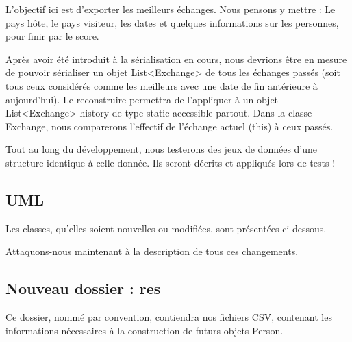 \documentclass{mytex}
\begin{document}

L'objectif ici est d'exporter les meilleurs échanges.
Nous pensons y mettre : Le pays hôte, le pays visiteur, les dates et quelques informations sur les personnes, pour finir par le score.


Après avoir été introduit à la sérialisation en cours, nous devrions être en mesure de pouvoir sérialiser un objet List<Exchange> de tous les échanges passés (soit tous ceux considérés comme les meilleurs avec une date de fin antérieure à aujourd'hui). Le reconstruire permettra de l'appliquer à un objet List<Exchange> history de type static accessible partout. Dans la classe Exchange, nous comparerons l'effectif de l'échange actuel (this) à ceux passés.


Tout au long du développement, nous testerons des jeux de données d'une structure identique à celle donnée. Ils seront décrits et appliqués lors de tests !

\subsection{UML}

Les classes, qu'elles soient nouvelles ou modifiées, sont présentées ci-dessous.


Attaquons-nous maintenant à la description de tous ces changements.



\subsection{Nouveau dossier : res}

Ce dossier, nommé par convention, contiendra nos fichiers CSV, contenant les informations nécessaires à la construction de futurs objets Person.
\end{document}
